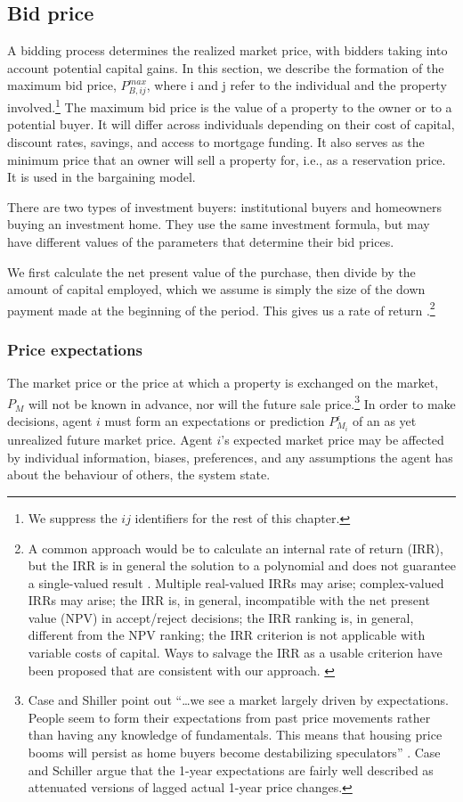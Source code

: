 {\subsection{Bid price}\label{sec:bid-price}
A bidding process determines the realized market price, with bidders taking into account potential capital gains. In this section, we describe the formation of the maximum bid price, $P_{B,ij}^{max}$, where i and j refer to the individual and the property involved.\footnote{We suppress the $ij$ identifiers for the rest of this chapter. } The maximum bid price is the value of a property to the owner or to a potential buyer. It will differ across individuals depending on their cost of capital, discount rates,  savings, and access to mortgage funding. It also serves as the minimum price that an owner will sell a property for,  i.e., as a reservation price. It is used in the bargaining model.

There are two types of investment buyers: institutional buyers and homeowners buying an investment home. They use the same investment formula, but may have different values of the parameters that determine their bid prices.

We first calculate the net present value of the purchase, then divide by the amount of capital employed, which we assume is simply the size of the down payment made at the beginning of the period. This gives us a rate of return
.\footnote{A common approach would be to calculate an internal rate of return (IRR), but  the IRR is in general the solution to a polynomial and does not guarantee a single-valued result \cite{robinsonOptimalTerminationIRR1996}. 
Multiple real-valued  IRRs may arise;  complex-valued IRRs may arise;  the IRR is, in general, incompatible with the net present value (NPV) in accept/reject decisions; the IRR ranking is, in general, different from the NPV ranking; the IRR criterion is not applicable with variable costs of capital. Ways to salvage the IRR as a usable criterion have been proposed that are consistent with our approach. \cite{magniAverageInternalRate2010}} 


\subsubsection{Price expectations}
The \gls{market price} or the price at which a property is exchanged on the market, $P_M$ will not be known in advance, nor will the future sale price.\footnote{Case and Shiller point out ``\dots we see a market largely driven by expectations. People seem to form their expectations from past price movements rather than having any knowledge of fundamentals. This means that housing price booms will persist as home buyers become destabilizing speculators''  \cite{caseThereBubbleHousing2003}. Case and Schiller\cite{caseThereBubbleHousing2003} argue that  the 1-year expectations are fairly well described as attenuated versions of lagged actual 1-year price changes.}  In order to make decisions, agent $i$ must form an \glspl{expectation} or prediction $P_{M_i}^{\epsilon}$ of an as yet unrealized future market price. Agent $i$'s expected market price may be affected by individual information, biases, preferences, and any assumptions the agent has about the behaviour of others, the system state.  


}
